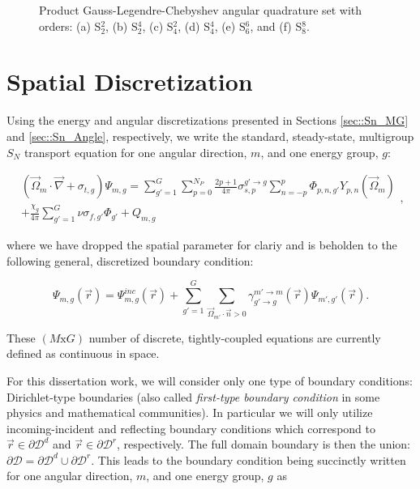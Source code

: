 \begin{figure}
\begin{subfigure}[b]{0.48\textwidth}
		\caption{}
	\end{subfigure}
\caption[Product Gauss-Legendre-Chebyshev angular quadrature set]{Product Gauss-Legendre-Chebyshev angular quadrature set with orders: (a) S$_2^2$, (b) S$_2^4$, (c) S$_4^2$, (d) S$_4^4$, (e) S$_6^6$, and (f) S$_8^8$.}
\label{fig::Sn_Angle_PGLC_Quads}
\end{figure}

\section{Spatial Discretization}
\label{sec::Sn_Spatial}

Using the energy and angular discretizations presented in Sections \ref{sec::Sn_MG} and \ref{sec::Sn_Angle}, respectively, we write the standard, steady-state, multigroup $S_N$ transport equation for one angular direction, $m$, and one energy group, $g$:

\begin{equation}
\label{eq::Sn_mg_sn_trans_eq}
\begin{aligned}
	 \left( \vec{\Omega}_m \cdot \vec{\nabla}  + \sigma_{t,g}  \right)  \Psi_{m,g}= \sum_{g'=1}^{G} \sum_{p=0}^{N_P} \frac{2p + 1}{4 \pi} \sigma_{s,p}^{g' \rightarrow g}   \sum_{n=-p}^{p}  \Phi_{p,n,g'}  Y_{p,n} (  \vec{\Omega}_m )  \\
	+ \frac{\chi_g}{4 \pi} \sum_{g'=1}^{G} \nu \sigma_{f,g'} \Phi_{g'}   + Q_{m,g}
\end{aligned} , 
\end{equation}

\noindent where we have dropped the spatial parameter for clariy and is beholden to the following general, discretized boundary condition:

\begin{equation}
\label{eq::Sn_mg_sn_trans_eq_bc}
\Psi_{m,g} (\vec{r}) = \Psi^{inc}_{m,g} (\vec{r}) + \sum_{g'=1}^{G} \sum_{\vec{\Omega}_{m'} \cdot \vec{n} > 0} \gamma_{g' \rightarrow g}^{m' \rightarrow m} (\vec{r})  \Psi_{m',g'} (\vec{r})  .
\end{equation}

\noindent These $(M \text{x} G)$ number of discrete, tightly-coupled equations are currently defined as continuous in space.

For this dissertation work, we will consider only one type of boundary conditions: Dirichlet-type boundaries (also called {\em first-type boundary condition} in some physics and mathematical communities). In particular we will only utilize incoming-incident and reflecting boundary conditions which correspond to $\vec{r} \in \partial \mathcal{D}^d$ and $\vec{r} \in \partial \mathcal{D}^r$, respectively. The full domain boundary is then the union: $\partial \mathcal{D} = \partial \mathcal{D}^d \cup \partial \mathcal{D}^r$. This leads to the boundary condition being succinctly written for one angular direction, $m$, and one energy group, $g$ as

